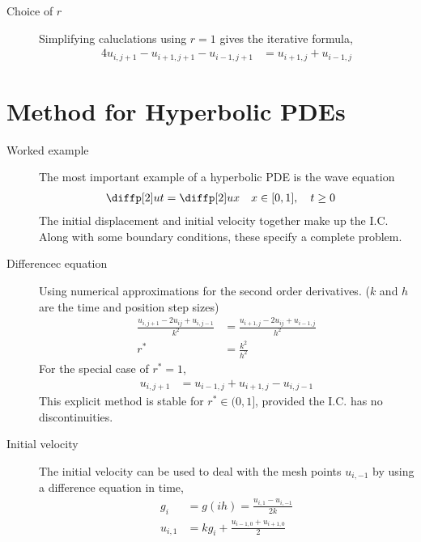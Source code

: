 \begin{description}
    \item[Choice of $ r $] Simplifying caluclations using $ r=1 $ gives the iterative
        formula,
        \begin{align}
            4u_{i,j+1} - u_{i+1,j+1} - u_{i-1,j+1} & = u_{i+1,j} + u_{i-1,j}
        \end{align}

\end{description}

\section{Method for Hyperbolic PDEs}

\begin{description}
    \item[Worked example] The most important example of a hyperbolic PDE is the wave
        equation
        \begin{align}
            \diffp[2] ut & = \diffp[2] ux & x & \in [0,1], \quad t \geq 0
        \end{align}
        The initial displacement and initial velocity together make up the I.C.
        Along with some boundary conditions, these specify a complete problem.

    \item[Differencec equation] Using numerical approximations for the second order
        derivatives. ($ k $ and $ h $ are the time and position step sizes)
        \begin{align}
            \frac{u_{i,j+1} - 2u_{ij} + u_{i,j-1}}{k^2} &
            = \frac{u_{i+1,j} - 2u_{ij} + u_{i-1,j}}{h^2}                   \\
            r^*                                         & = \frac{k^2}{h^2}
        \end{align}
        For the special case of $ r^* = 1 $,
        \begin{align}
            u_{i,j+1} & = u_{i-1,j} + u_{i+1,j} - u_{i,j-1}
        \end{align}
        This explicit method is stable for $ r^* \in (0,1] $, provided the I.C. has no
        discontinuities.

    \item[Initial velocity] The initial velocity can be used to deal with the mesh points
        $ u_{i,-1} $ by using a difference equation in time,
        \begin{align}
            g_i     & = g(ih) = \frac{u_{i,1} - u_{i,-1}}{2k}  \\
            u_{i,1} & = kg_i + \frac{u_{i-1,0} + u_{i+1,0}}{2}
        \end{align}
\end{description}
